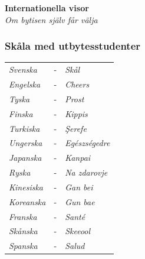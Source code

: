 \begin{center}
    \vspace*{1.5cm}
    {\fontsize{20}{20}\textbf{Internationella visor}}\\
    \vspace{0.7cm}
    {\fontsize{12}{12}\textit{Om bytisen själv får välja}}
\end{center}
\noBackground

\newpage
\resetBackground

\subsubsection*{Skåla med utbytesstudenter}


\begin{tabular}{l l l}
    \textit{Svenska} & - & \hspace{10pt} \textit{Skål} \\
    \textit{Engelska} & - & \hspace{10pt} \textit{Cheers} \\
    \textit{Tyska} & - & \hspace{10pt} \textit{Prost} \\
    \textit{Finska} & - & \hspace{10pt} \textit{Kippis} \\
    \textit{Turkiska} & - & \hspace{10pt} \textit{Şerefe} \\
    \textit{Ungerska} & - & \hspace{10pt} \textit{Egészségedre} \\
    \textit{Japanska} & - & \hspace{10pt} \textit{Kanpai} \\
    \textit{Ryska} & - & \hspace{10pt} \textit{Na zdarovje} \\
    \textit{Kinesiska} & - & \hspace{10pt} \textit{Gan bei} \\
    \textit{Koreanska} & - & \hspace{10pt} \textit{Gun bae} \\
    \textit{Franska} & - & \hspace{10pt} \textit{Santé} \\
    \textit{Skånska} & - & \hspace{10pt} \textit{Skeeool} \\
    \textit{Spanska} & - & \hspace{10pt} \textit{Salud} \\

\end{tabular}
